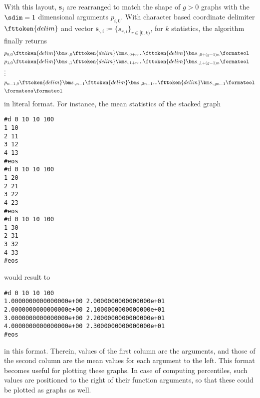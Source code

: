 With this layout, $\bm s_j$ are rearranged to match the shape of $g > 0$ graphs with the $\sdim=1$ dimensional arguments $p_{i,0}$. With character based coordinate delimiter $\fttoken{delim}$ and vector $\bm s_{\cdot,i} \coloneqq \{s_{r,i}\}_{r \in [0,k)}$, for $k$ statistics, the algorithm finally returns
\begin{align*}
  &p_{0,0}\fttoken{delim}\bm s_{\cdot,0}\fttoken{delim}\bm s_{\cdot,0+n}...\fttoken{delim}\bm s_{\cdot,0+(g-1)n}\formateol\\
  &p_{1,0}\fttoken{delim}\bm s_{\cdot,1}\fttoken{delim}\bm s_{\cdot,1+n}...\fttoken{delim}\bm s_{\cdot,1+(g-1)n}\formateol\\
  &\vdots \\
  &p_{n-1,0}\fttoken{delim}\bm s_{\cdot,n-1}\fttoken{delim}\bm s_{\cdot,2n-1}...\fttoken{delim}\bm s_{\cdot,gn-1}\formateol\\
  &\formateos\formateol
\end{align*}
in literal format. For instance, the mean statistics of the stacked graph
\begin{verbatim}
#d 0 10 10 100
1 10
2 11
3 12
4 13
#eos
#d 0 10 10 100
1 20
2 21
3 22
4 23
#eos
#d 0 10 10 100
1 30
2 31
3 32
4 33
#eos
\end{verbatim}
would result to
\begin{verbatim}
#d 0 10 10 100
1.0000000000000000e+00 2.0000000000000000e+01
2.0000000000000000e+00 2.1000000000000000e+01
3.0000000000000000e+00 2.2000000000000000e+01
4.0000000000000000e+00 2.3000000000000000e+01
#eos
\end{verbatim}
in this format. Therein, values of the first column are the arguments, and those of the second column are the mean values for each argument to the left. This format becomes useful for plotting these graphs. In case of computing percentiles, such values are positioned to the right of their function arguments, so that these could be plotted as graphs as well.
